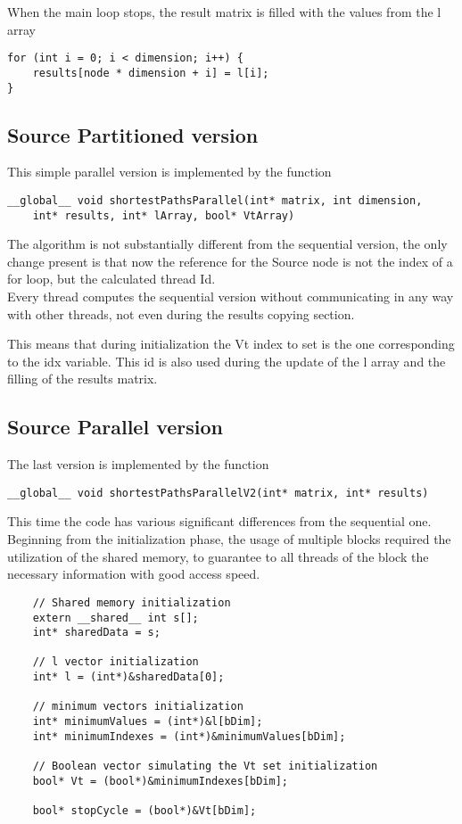 \documentclass[
	a4paper, %
	12pt, %
]{class}
\begin{document}
When the main loop stops, the result matrix is filled with the values from the l array
\begin{verbatim}
for (int i = 0; i < dimension; i++) {
    results[node * dimension + i] = l[i];
}
\end{verbatim}

\subsection{Source Partitioned version}
This simple parallel version is implemented by the function
\begin{verbatim}
__global__ void shortestPathsParallel(int* matrix, int dimension,
    int* results, int* lArray, bool* VtArray)
\end{verbatim}

The algorithm is not substantially different from the sequential version, the only change present is that now the reference for the
Source node is not the index of a for loop, but the calculated thread Id.\\

Every thread computes the sequential version without communicating in any way with other threads, not even during
the results copying section.

This means that during initialization the Vt index to set is the one corresponding to the idx variable. This id is also used during the
update of the l array and the filling of the results matrix.\\

\subsection{Source Parallel version}
The last version is implemented by the function
\begin{verbatim}
__global__ void shortestPathsParallelV2(int* matrix, int* results)
\end{verbatim}

This time the code has various significant differences from the sequential one.\\

Beginning from the initialization phase, the usage of multiple blocks required the utilization of the shared memory, to guarantee to all threads of the block
the necessary information with good access speed.
\begin{verbatim}
    // Shared memory initialization
    extern __shared__ int s[];
    int* sharedData = s;
    
    // l vector initialization
    int* l = (int*)&sharedData[0];
    
    // minimum vectors initialization
    int* minimumValues = (int*)&l[bDim];
    int* minimumIndexes = (int*)&minimumValues[bDim];
    
    // Boolean vector simulating the Vt set initialization
    bool* Vt = (bool*)&minimumIndexes[bDim];
    
    bool* stopCycle = (bool*)&Vt[bDim];
\end{verbatim}
\end{document}
